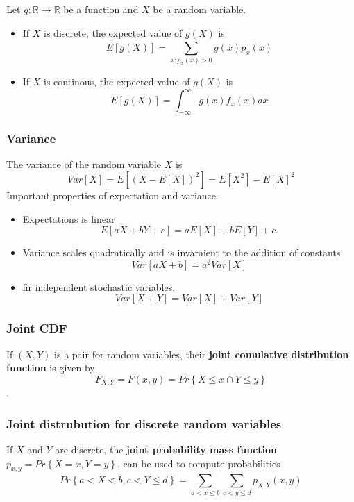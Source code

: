 \documentclass{article}
\theoremstyle{remark}
\begin{document}
Let $g: \mathbb{R}  \to \mathbb{R} $ be a function and $X$ be a random variable.
\begin{itemize}
  \item If $X$ is discrete, the expected value of $g\left( X \right) $ is \[
  E\left[ g\left( X \right) \right] =  \sum_{x: p_{x}\left( x \right)> 0}^{} g\left( x \right) p_{x}\left( x \right)  
  \] 
\item If $X$ is continous, the expected value of $g\left( X \right) $ is  \[
E\left[ g\left( X \right) \right] = \int_{-\infty}^{\infty} g\left( x \right)f_{x}\left( x \right) dx 
\] 
\end{itemize}

\subsubsection{Variance}%
\label{ssub:variance}

The variance of the random variable $X$ is \[
  Var\left[ X \right] =  E \left[( X - E\left[ X \right])^{2} \right] =  E\left[ X^2 \right] - E\left[ X \right]^2 
\] 
Important properties of expectation and variance.
\begin{itemize}
  \item Expectations is linear \[
  E\left[ aX + bY +c \right] = aE\left[ X \right] + bE\left[ Y \right] + c.
  \] 
\item Variance scales quadratically and is invaraient to the addition of constants \[
Var\left[ aX + b \right] = a^2 Var \left[ X \right] 
\] 
\item fir independent stochastic variables.\[
    Var \left[ X + Y \right] = Var \left[ X \right] + Var\left[ Y \right]
\] 
\end{itemize}

\subsubsection{Joint CDF}%
\label{ssub:joint_cdf}

If $\left( X,Y \right)$ is a pair for random variables, their \textbf{joint comulative distribution function } is given by \[
F_{X,Y} = F\left( x,y \right) =  Pr\left\{ X \le x \cap Y \le y \right\}
\]. 
\subsubsection{Joint distrubution for discrete random variables}%
\label{ssub:joint_distrobution_for_discrete_random_variables}
If $X$ and $Y$  are discrete, the \textbf{joint probability mass function } $ p_{x,y} = Pr\left\{ X = x, Y =y \right\} $. can be used to compute probabilities \[
Pr\left\{ a < X < b, c < Y \le d \right\} =  \sum_{a < x \le b}^{}  \sum_{c < y \le d}^{} p_{X,Y}   \left( x,y \right)
\] 
\end{document}
